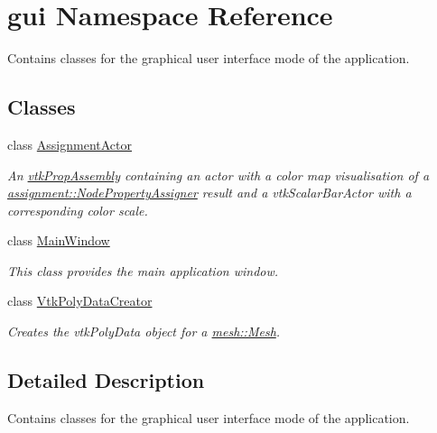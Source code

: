 \hypertarget{namespacegui}{
\section{gui Namespace Reference}
\label{namespacegui}
}


Contains classes for the graphical user interface mode of the application.  


\subsection*{Classes}
\begin{DoxyCompactItemize}
\item 
class \hyperlink{classgui_1_1_assignment_actor}{AssignmentActor}
\begin{DoxyCompactList}\small\item\em An \hyperlink{classvtk_prop_assembly}{vtkPropAssembly} containing an actor with a color map visualisation of a \hyperlink{classassignment_1_1_node_property_assigner}{assignment::NodePropertyAssigner} result and a vtkScalarBarActor with a corresponding color scale. \item\end{DoxyCompactList}\item 
class \hyperlink{classgui_1_1_main_window}{MainWindow}
\begin{DoxyCompactList}\small\item\em This class provides the main application window. \item\end{DoxyCompactList}\item 
class \hyperlink{classgui_1_1_vtk_poly_data_creator}{VtkPolyDataCreator}
\begin{DoxyCompactList}\small\item\em Creates the vtkPolyData object for a \hyperlink{classmesh_1_1_mesh}{mesh::Mesh}. \item\end{DoxyCompactList}\end{DoxyCompactItemize}


\subsection{Detailed Description}
Contains classes for the graphical user interface mode of the application. 
